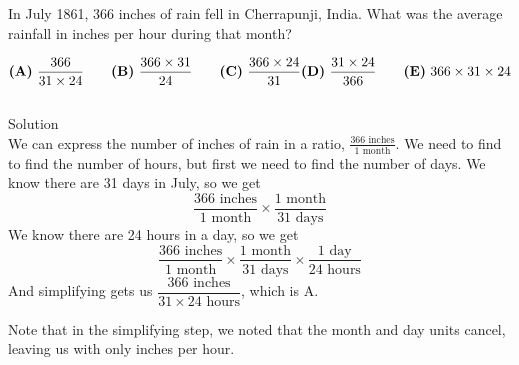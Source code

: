 

In July 1861, $ 366$ inches of rain fell in Cherrapunji, India. What was the average rainfall in inches per hour during that month?

\[ \textbf{(A)}\ \frac{366}{31 \times 24} \qquad
\textbf{(B)}\ \frac{366 \times 31}{24} \qquad
\textbf{(C)}\ \frac{366 \times 24}{31} \\ 
\textbf{(D)}\ \frac{31 \times 24}{366} \qquad
\textbf{(E)}\ 366 \times 31 \times 24
\]
\\
Solution
\\
We can express the number of inches of rain in a ratio, $\frac{366 \text{ inches}}{1\text{  month}}$. We need to find to find the number of hours, but first we need to find the number of days. We know there are 31 days in July, so we get \[\frac{366 \text{ inches}}{1 \text{ month}} \times \frac{1 \text{ month}}{31 \text{ days}}\]
We know there are 24 hours in a day, so we get \[\frac{366 \text{ inches}}{1 \text{ month}} \times \frac{1 \text{ month}}{31 \text{ days}} \times \frac{1 \text{ day}}{24 \text{ hours}}\]
And simplifying gets us $\dfrac{366 \text{ inches}}{31 \times 24 \text{ hours}}$, which is $\boxed{\text{A}}$.

Note that in the simplifying step, we noted that the month and day units cancel, leaving us with only inches per hour.
